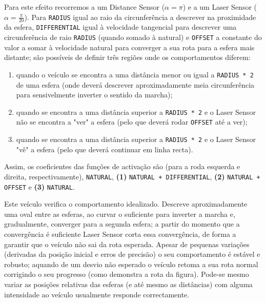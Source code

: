 \documentclass[a4paper]{article}
\begin{document}
Para este efeito recorremos a um Distance Sensor ($\alpha = \pi$) e a um Laser Sensor ($\alpha = \frac{\pi}{20}$).
Para \texttt{RADIUS} igual ao raio da circunferência a descrever na proximidade da esfera, \texttt{DIFFERENTIAL} igual à velocidade tangencial para descrever uma circunferência de raio \texttt{RADIUS} (quando somado à natural) e \texttt{OFFSET} a constante do valor a somar à velocidade natural para converger a sua rota para a esfera mais distante; são possíveis de definir três regiões onde os comportamentos diferem:
\begin{enumerate}
\item quando o veículo se encontra a uma distância menor ou igual a \texttt{RADIUS * 2} de uma esfera (onde deverá descrever aproximadamente meia circunferência para sensivelmente inverter o sentido da marcha);
\item quando se encontra a uma distância superior a \texttt{RADIUS * 2} e o Laser Sensor não se encontra a "ver" a esfera (pelo que deverá rodar \texttt{OFFSET} até a ver);
\item quando se encontra a uma distância superior a \texttt{RADIUS * 2} e o Laser Sensor "vê" a esfera (pelo que deverá continuar em linha recta).
\end{enumerate}

Assim, os coeficientes das funções de activação são (para a roda esquerda e direita, respectivamente), \texttt{NATURAL}, \textbf{(1)} \texttt{NATURAL + DIFFERENTIAL}, \textbf{(2)} \texttt{NATURAL + OFFSET} e \textbf{(3)} \texttt{NATURAL}.

Este veículo verifica o comportamento idealizado. Descreve aproximadamente uma oval entre as esferas, ao curvar o suficiente para inverter a marcha e, gradualmente, converger para a segunda esfera; a partir do momento que a convergência é suficiente Laser Sensor corta essa convergência, de forma a garantir que o veículo não sai da rota esperada. Apesar de pequenas variações (derivadas da posição inicial e erros de precisão) o seu comportamento é estável e robusto; aquando de um desvio não esperado o veículo retoma a sua rota normal corrigindo o seu progresso (como demonstra a rota da figura). Pode-se mesmo variar as posições relativas das esferas (e até mesmo as distâncias) com alguma intensidade ao veículo usualmente responde correctamente.

\cleardoublepage
\end{document}
